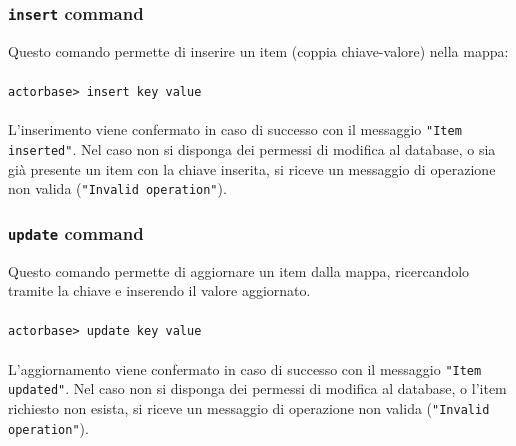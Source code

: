 \documentclass[a4paper]{article}
\begin{document}
	\subsubsection{\texttt{insert} command}
	Questo comando permette di inserire un item (coppia chiave-valore) nella mappa:
	\\ \\
	\texttt{actorbase>	insert key value}
	\\ \\
	L'inserimento viene confermato in caso di successo con il messaggio \texttt{"Item inserted"}. Nel caso non si disponga dei permessi di modifica al database, o sia già presente un item con la chiave inserita, si riceve un messaggio di operazione non valida (\texttt{"Invalid operation"}).
	
	\subsubsection{\texttt{update} command}
	Questo comando permette di aggiornare un item dalla mappa, ricercandolo tramite la chiave e inserendo il valore aggiornato.
	\\ \\
	\texttt{actorbase>	update key value}
	\\ \\
	L'aggiornamento viene confermato in caso di successo con il messaggio \texttt{"Item updated"}. Nel caso non si disponga dei permessi di modifica al database, o l'item 
	richiesto non esista, si riceve un messaggio di operazione non valida (\texttt{"Invalid operation"}).
			
	\cleardoublepage
	\listoffigures
	
	\cleardoublepage
	\listoftables
		
\end{document}
